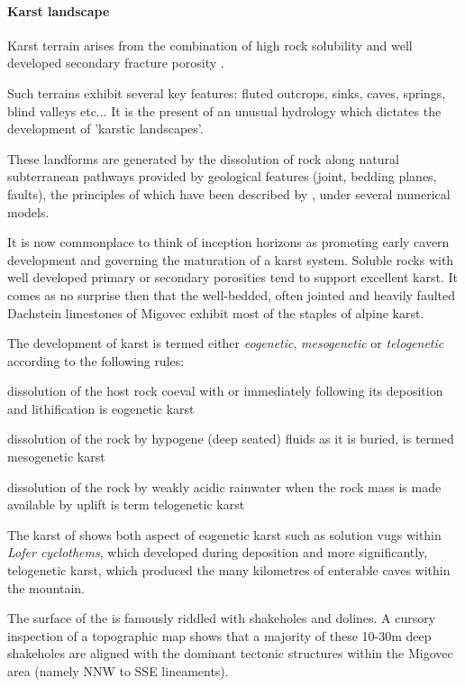  \paragraph{Karst landscape}
Karst terrain arises from the combination of high rock solubility and well developed secondary fracture porosity \citep{ford2013karst}. 

Such terrains exhibit several key features: fluted outcrops, sinks, caves, springs, blind valleys etc... It is the present of an unusual hydrology which dictates the development of 'karstic landscapes'. 

These landforms are generated by the dissolution of rock along natural subterranean pathways provided by geological features (joint, bedding planes, faults), the principles of which have been described by \citet{dreybrodt1996principles}, under several numerical models.

It is now commonplace to think of inception horizons \citep{lowe1997carbonate} as promoting early cavern development and governing the maturation of a karst system. Soluble rocks with well developed primary or secondary porosities tend to support excellent karst. It comes as no surprise then that the well-bedded, often jointed and heavily faulted Dachstein limestones of Migovec exhibit most of the staples of alpine karst.

The development of karst is termed either \emph{eogenetic}, \emph{mesogenetic} or \emph{telogenetic} according to the following rules:
\begin{citemize}
\item dissolution of the host rock coeval with or immediately following its deposition and lithification is eogenetic karst 
\item dissolution of the rock by hypogene (deep seated) fluids as it is buried, is termed mesogenetic karst
\item dissolution of the rock by weakly acidic rainwater when the rock mass is made available by uplift is term telogenetic karst
\end{citemize}

The karst of  shows both aspect of eogenetic karst such as solution vugs within \emph{Lofer cyclothems}, which developed during deposition and more significantly, telogenetic karst, which produced the many kilometres of enterable caves within the mountain.

The surface of the  is famously riddled with shakeholes and dolines. A cursory inspection of a topographic map shows that a majority of these 10-30m deep shakeholes are aligned with the dominant tectonic structures within the Migovec area (namely NNW to SSE lineaments). 

